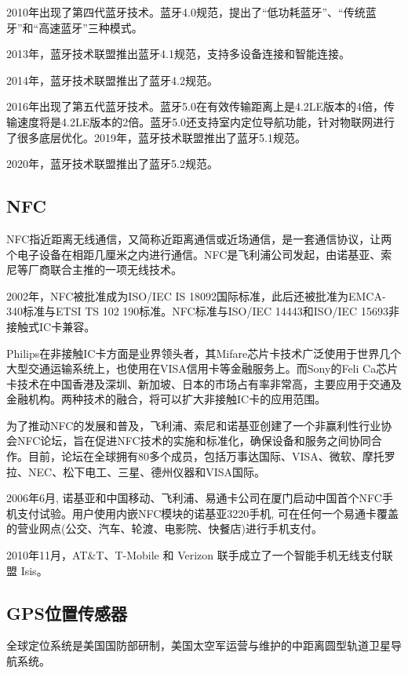 \documentclass[a4paper,11pt,onecolumn,twoside]{article}
\begin{document}
\begin{multicols}{2}
2010年出现了第四代蓝牙技术。蓝牙4.0规范，提出了“低功耗蓝牙”、“传统蓝牙”和“高速蓝牙”三种模式。

2013年，蓝牙技术联盟推出蓝牙4.1规范，支持多设备连接和智能连接。

2014年，蓝牙技术联盟推出了蓝牙4.2规范。\cite{BlueTooth}

2016年出现了第五代蓝牙技术。蓝牙5.0在有效传输距离上是4.2LE版本的4倍，传输速度将是4.2LE版本的2倍。蓝牙5.0还支持室内定位导航功能，针对物联网进行了很多底层优化。2019年，蓝牙技术联盟推出了蓝牙5.1规范。

2020年，蓝牙技术联盟推出了蓝牙5.2规范。

\subsection{NFC}

NFC指近距离无线通信，又简称近距离通信或近场通信，是一套通信协议，让两个电子设备在相距几厘米之内进行通信。NFC是飞利浦公司发起，由诺基亚、索尼等厂商联合主推的一项无线技术。

2002年，NFC被批准成为ISO/IEC IS 18092国际标准，此后还被批准为EMCA-340标准与ETSI TS 102 190标准。NFC标准与ISO/IEC 14443和ISO/IEC 15693非接触式IC卡兼容。

Philips在非接触IC卡方面是业界领头者，其Mifare芯片卡技术广泛使用于世界几个大型交通运输系统上，也使用在VISA信用卡等金融服务上。而Sony的Feli Ca芯片卡技术在中国香港及深圳、新加坡、日本的市场占有率非常高，主要应用于交通及金融机构。两种技术的融合，将可以扩大非接触IC卡的应用范围。

为了推动NFC的发展和普及，飞利浦、索尼和诺基亚创建了一个非赢利性行业协会NFC论坛，旨在促进NFC技术的实施和标准化，确保设备和服务之间协同合作。目前，论坛在全球拥有80多个成员，包括万事达国际、VISA、微软、摩托罗拉、NEC、松下电工、三星、德州仪器和VISA国际。\cite{BlueTooth2}

2006年6月, 诺基亚和中国移动、飞利浦、易通卡公司在厦门启动中国首个NFC手机支付试验。用户使用内嵌NFC模块的诺基亚3220手机, 可在任何一个易通卡覆盖的营业网点(公交、汽车、轮渡、电影院、快餐店)进行手机支付\cite{NFC}。

2010年11月，AT\&T、T-Mobile 和 Verizon 联手成立了一个智能手机无线支付联盟 Isis。

\subsection{GPS位置传感器}

全球定位系统是美国国防部研制，美国太空军运营与维护的中距离圆型轨道卫星导航系统。


\end{multicols}
\end{document}
